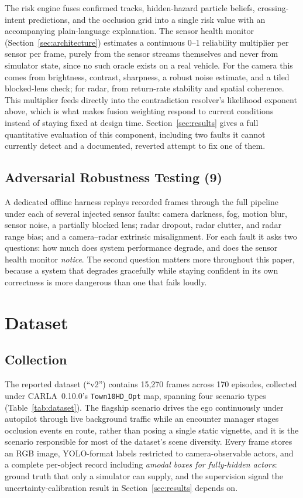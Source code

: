 \documentclass[conference]{IEEEtran}
\begin{document}
The risk engine fuses confirmed tracks, hidden-hazard particle beliefs,
crossing-intent predictions, and the occlusion grid into a single risk
value with an accompanying plain-language explanation. The sensor
health monitor (Section~\ref{sec:architecture}) estimates a continuous
0--1 reliability multiplier per sensor per frame, purely from the
sensor streams themselves and never from simulator state, since no such
oracle exists on a real vehicle. For the camera this comes from
brightness, contrast, sharpness, a robust noise estimate, and a tiled
blocked-lens check; for radar, from return-rate stability and spatial
coherence. This multiplier feeds directly into the contradiction
resolver's likelihood exponent above, which is what makes fusion
weighting respond to current conditions instead of staying fixed at
design time. Section~\ref{sec:results} gives a full quantitative
evaluation of this component, including two faults it cannot currently
detect and a documented, reverted attempt to fix one of them.

\subsection{Adversarial Robustness Testing (9)}

A dedicated offline harness replays recorded frames through the full
pipeline under each of several injected sensor faults: camera
darkness, fog, motion blur, sensor noise, a partially blocked lens;
radar dropout, radar clutter, and radar range bias; and a
camera--radar extrinsic misalignment. For each fault it asks two
questions: how much does system performance degrade, and does the
sensor health monitor \emph{notice}. The second question matters more
throughout this paper, because a system that degrades gracefully while
staying confident in its own correctness is more dangerous than one
that fails loudly.

\section{Dataset}
\label{sec:dataset}

\subsection{Collection}

The reported dataset (``v2'') contains 15{,}270 frames across 170
episodes, collected under CARLA~0.10.0's \texttt{Town10HD\_Opt} map,
spanning four scenario types (Table~\ref{tab:dataset}). The flagship
scenario drives the ego continuously under autopilot through live
background traffic while an encounter manager stages occlusion events
en route, rather than posing a single static vignette, and it is the
scenario responsible for most of the dataset's scene diversity. Every
frame stores an RGB image, YOLO-format labels restricted to
camera-observable actors, and a complete per-object record including
\emph{amodal boxes for fully-hidden actors}: ground truth that only a
simulator can supply, and the supervision signal the
uncertainty-calibration result in Section~\ref{sec:results} depends on.
\end{document}
